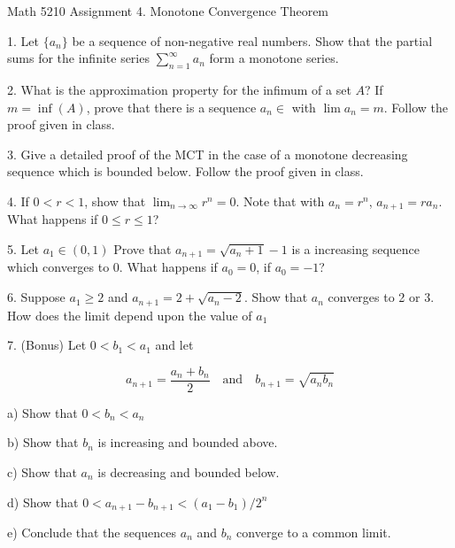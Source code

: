 \documentclass[10pt,letterpaper]{article}
\begin{document}
Math 5210 Assignment 4. Monotone Convergence Theorem

\bigskip

1. Let $\{a_n\}$ be a sequence of non-negative real numbers. Show that the partial sums for the infinite series $\displaystyle \sum_{n=1}^{\infty } a_n$ form a monotone series.

\bigskip

2. What is the approximation property for the infimum of a set $A$? If $m = \inf(A)$, prove that there is a sequence $a_n \in $ with $\lim a_n = m$. Follow the proof given in class.

\bigskip

3. Give a detailed proof of the MCT in the case of a monotone decreasing sequence which is bounded below. Follow the proof given in class.

\bigskip

4. If $0 < r < 1$, show that $\displaystyle \lim_{n \to \infty} r^n= 0$. Note that with $a_n = r^n$, $a_{n+1} = r a_n$. What happens if $0 \leq r \leq 1$?

\bigskip

5. Let $a_1 \in (0, 1)$ Prove that $a_{n+1} = \sqrt{a_{n} +1} -1 $ is a increasing sequence which converges to 0. What happens if $a_0 = 0$, if $a_0 = -1$?

\bigskip

6. Suppose $a_1 \geq 2$ and $a_{n +1} = 2 + \sqrt{a_n - 2}$. Show that $a_n$ converges to 2 or 3. How does the limit depend upon the value of $a_1$

\bigskip

7. (Bonus) Let $0 < b_1 < a_1$ and let

\begin{equation*}
 a_{n+1} = \frac{a_n + b_n}{2} \quad \text{and} \quad b_{n+1} = \sqrt{a_n b_n}
\end{equation*}

\medskip

a) Show that $0 < b_n < a_n$

\medskip

b) Show that $b_n$ is increasing and bounded above.

\medskip
c) Show that $a_n$ is decreasing and bounded below.

\medskip
d) Show that $ 0 < a_{n+1} - b_{n+1} < (a_1 - b_1)/2^n$

\medskip
e) Conclude that the sequences $a_n$ and $b_n$ converge to a common limit.
\end{document}
